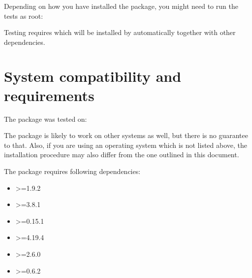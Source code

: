 \documentclass[letterpaper,10pt,english]{sphinxmanual}
\begin{document}
\begin{sphinxVerbatim}[commandchars=\\\{\}]
  
\end{sphinxVerbatim}

Depending on how you have installed the package, you might need to run the tests as root:

\begin{sphinxVerbatim}[commandchars=\\\{\}]
   
\end{sphinxVerbatim}

Testing requires  which will be installed by  automatically together with other dependencies.


\chapter{System compatibility and requirements}
\label{\detokenize{index:system-compatibility-and-requirements}}
The package was tested on:

\begin{sphinxVerbatim}[commandchars=\\\{\}]
    
  
  
  
\end{sphinxVerbatim}

The package is likely to work on other systems as well, but there is no guarantee to that. Also, if you are using an operating system which is not listed above, the installation procedure may also differ from the one outlined in this document.

The package requires following dependencies:
\begin{itemize}
\item {} 
 \textgreater{}=1.9.2

\item {} 
\textgreater{}=3.8.1

\item {} 
\textgreater{}=0.15.1

\item {} 
\textgreater{}=4.19.4

\item {} 
\textgreater{}=2.6.0

\item {} 
\textgreater{}=0.6.2

\end{itemize}
\end{document}
